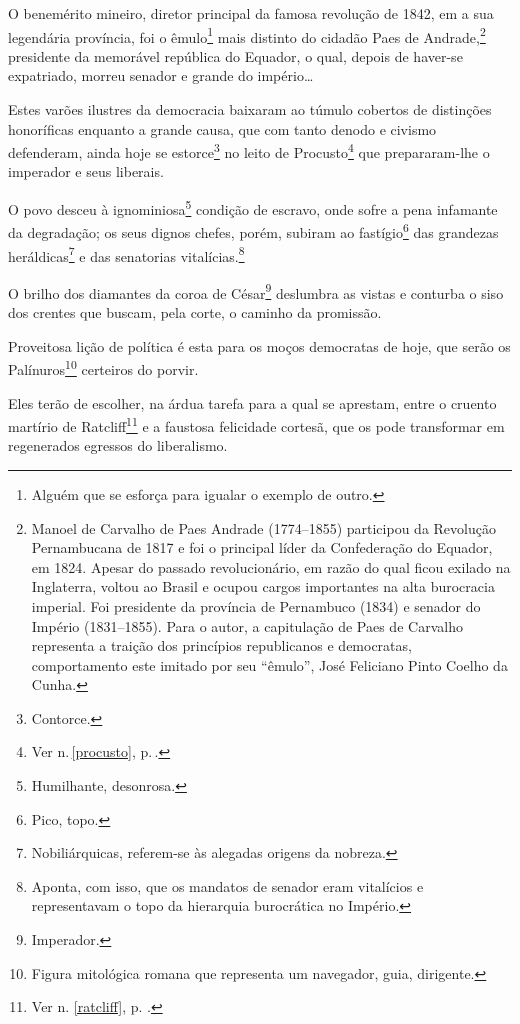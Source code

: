 O benemérito mineiro, diretor principal da famosa revolução de 1842, em
a sua legendária província, foi o êmulo\footnote{Alguém que se esforça
  para igualar o exemplo de outro.} mais distinto do cidadão Paes de
Andrade,\footnote{Manoel de Carvalho de Paes Andrade (1774--1855)
  participou da Revolução Pernambucana de 1817 e foi o principal líder
  da Confederação do Equador, em 1824. Apesar do passado revolucionário,
  em razão do qual ficou exilado na Inglaterra, voltou ao Brasil e
  ocupou cargos importantes na alta burocracia imperial. Foi presidente
  da província de Pernambuco (1834) e senador do Império (1831--1855).
  Para o autor, a capitulação de Paes de Carvalho representa a traição
  dos princípios republicanos e democratas, comportamento este imitado
  por seu ``êmulo'', José Feliciano Pinto Coelho da Cunha.} presidente da
memorável república do Equador, o qual, depois de haver-se expatriado,
morreu senador e grande do império\ldots{}

Estes varões ilustres da democracia baixaram ao túmulo cobertos de
distinções honoríficas enquanto a grande causa, que com tanto denodo e
civismo defenderam, ainda hoje se estorce\footnote{Contorce.} no leito
de Procusto\footnote{Ver n.\,\ref{procusto}, p.\,\pageref{procusto}.} que prepararam-lhe o imperador e seus liberais.

O povo desceu à ignominiosa\footnote{Humilhante, desonrosa.} condição
de escravo, onde sofre a pena infamante da degradação; os seus dignos
chefes, porém, subiram ao fastígio\footnote{Pico, topo.} das grandezas
heráldicas\footnote{Nobiliárquicas, referem-se às alegadas origens da
  nobreza.} e das senatorias vitalícias.\footnote{Aponta, com isso,
  que os mandatos de senador eram vitalícios e representavam o topo da
  hierarquia burocrática no Império.}

O brilho dos diamantes da coroa de César\footnote{Imperador.}
deslumbra as vistas e conturba o siso dos crentes que buscam, pela
corte, o caminho da promissão.

Proveitosa lição de política é esta para os moços democratas de hoje,
que serão os Palínuros\footnote{Figura mitológica romana que representa um navegador, guia,
  dirigente.} certeiros do porvir.

Eles terão de escolher, na árdua tarefa para a qual se aprestam, entre o
cruento martírio de Ratcliff\footnote{Ver n. \ref{ratcliff}, p. \pageref{ratcliff}.} 
e a faustosa felicidade cortesã, que os pode transformar em regenerados 
egressos do liberalismo.

